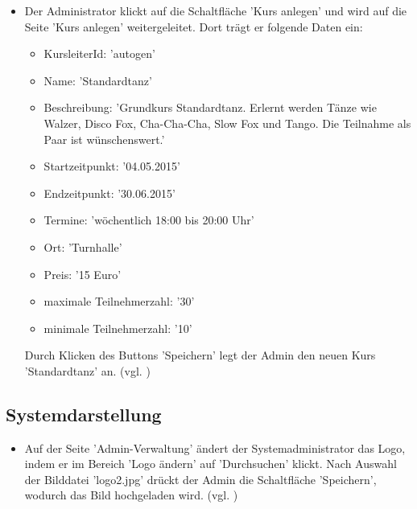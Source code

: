 \documentclass[a4paper]{scrreprt}
\begin{document}
\begin{itemize}
				\item {}
				 Der Administrator klickt auf die Schaltfläche 'Kurs anlegen' und wird auf die Seite 'Kurs anlegen' weitergeleitet. Dort trägt er folgende Daten ein:
						\begin{itemize}
							\item KursleiterId: 'autogen'
							\item Name: 'Standardtanz'
							\item Beschreibung: 'Grundkurs Standardtanz. Erlernt werden Tänze wie Walzer, Disco Fox, Cha-Cha-Cha, Slow Fox und Tango. Die Teilnahme als Paar ist wünschenswert.'
							\item Startzeitpunkt: '04.05.2015'
							\item Endzeitpunkt: '30.06.2015'
							\item Termine: 'wöchentlich 18:00 bis 20:00 Uhr'
							\item Ort: 'Turnhalle'
							\item Preis: '15 Euro'
							\item maximale Teilnehmerzahl: '30'	
							\item minimale Teilnehmerzahl: '10'
						\end{itemize}
				 Durch Klicken des Buttons 'Speichern' legt der Admin den neuen Kurs 'Standardtanz' an. (vgl. ) 					
			\end{itemize}			
								
		\subsection{Systemdarstellung}
			\begin{itemize}
				 \item {} 
				 Auf der Seite 'Admin-Verwaltung' ändert der Systemadministrator das Logo, indem er im Bereich 'Logo ändern' auf 'Durchsuchen' klickt. Nach Auswahl der Bilddatei 'logo2.jpg' drückt der Admin die Schaltfläche 'Speichern', wodurch das Bild hochgeladen wird. (vgl. )
			\end{itemize}
			
\end{document}

